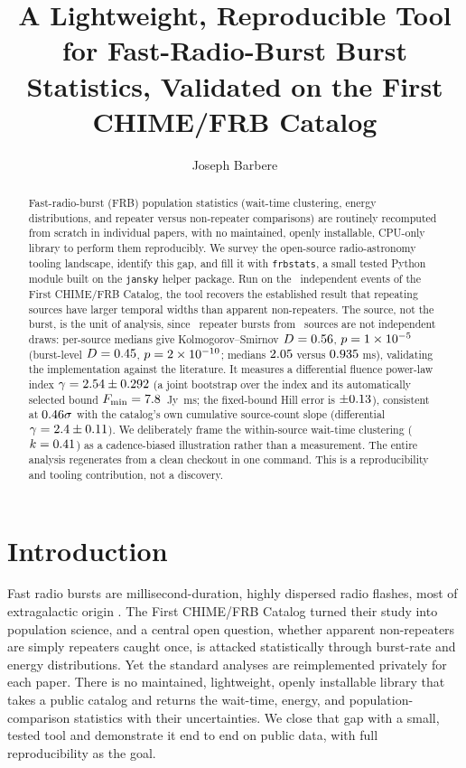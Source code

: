 \documentclass[twocolumn]{aastex631}
\newcommand{\code}[1]{\texttt{#1}}
\begin{document}
\title{A Lightweight, Reproducible Tool for Fast-Radio-Burst Burst Statistics,
Validated on the First CHIME/FRB Catalog}

\author[0009-0008-3289-4447]{Joseph Barbere}

\begin{abstract}
Fast-radio-burst (FRB) population statistics (wait-time clustering, energy
distributions, and repeater versus non-repeater comparisons) are routinely
recomputed from scratch in individual papers, with no maintained, openly installable,
CPU-only library to perform them reproducibly. We survey the open-source radio-astronomy
tooling landscape, identify this gap, and fill it with \code{frbstats}, a small tested
Python module built on the \code{jansky} helper package. Run on the \nBursts\ independent
events of the First CHIME/FRB Catalog, the tool recovers the established result that
repeating sources have larger temporal widths than apparent non-repeaters. The source, not
the burst, is the unit of analysis, since \nRepeaterBursts\ repeater
bursts from \nRepeaterSources\ sources are not independent draws: per-source medians give
Kolmogorov--Smirnov $D=0.56$, $p=1\times10^{-5}$ (burst-level $D=0.45$,
$p=2\times10^{-10}$; medians $2.05$ versus $0.935$ ms), validating the
implementation against the literature. It measures a differential fluence power-law index
$\gamma=2.54\pm0.292$ (a joint bootstrap over the index and its
automatically selected bound $F_\mathrm{min}=7.8$~Jy~ms; the fixed-bound Hill
error is $\pm0.13$), consistent at $0.46\sigma$ with the
catalog's own cumulative source-count slope (differential
$\gamma=2.4\pm0.11$). We deliberately frame the within-source
wait-time clustering ($k=0.41$) as a cadence-biased illustration rather than a
measurement. The entire analysis regenerates from a clean checkout in one command. This is
a reproducibility and tooling contribution, not a discovery.
\end{abstract}


\section{Introduction}
Fast radio bursts are millisecond-duration, highly dispersed radio flashes, most of
extragalactic origin \citep{chimecat1}. The First CHIME/FRB Catalog \citep{chimecat1}
turned their study into population science, and a central open question, whether
apparent non-repeaters are simply repeaters caught once, is attacked statistically
through burst-rate and energy distributions. Yet the standard analyses are reimplemented
privately for each paper. There is no maintained, lightweight, openly installable library
that takes a public catalog and returns the wait-time, energy, and population-comparison
statistics with their uncertainties. We close that gap with a small, tested tool and
demonstrate it end to end on public data, with full reproducibility as the goal.
\end{document}
